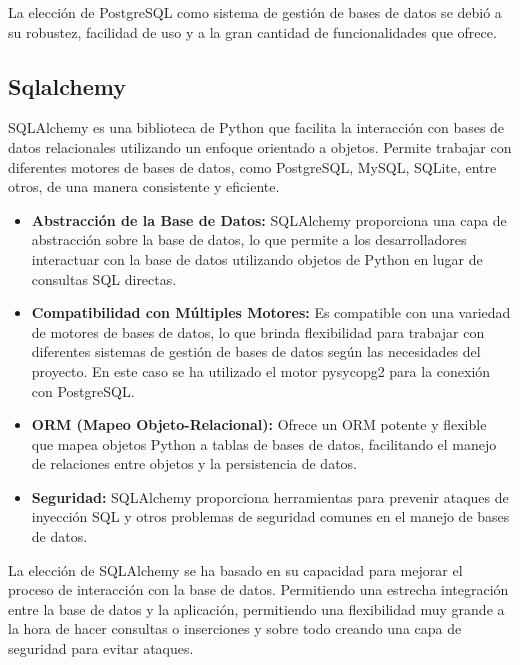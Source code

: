 La elección de PostgreSQL como sistema de gestión de bases de datos se debió a su robustez, facilidad de uso y a la gran cantidad de funcionalidades que ofrece.

\subsection{Sqlalchemy}
SQLAlchemy es una biblioteca de Python que facilita la interacción con bases de datos relacionales utilizando un enfoque orientado a objetos. Permite trabajar con diferentes motores de bases de datos, como PostgreSQL, MySQL, SQLite, entre otros, de una manera consistente y eficiente.

\begin{itemize}
	\item \textbf{Abstracción de la Base de Datos:} SQLAlchemy proporciona una capa de abstracción sobre la base de datos, lo que permite a los desarrolladores interactuar con la base de datos utilizando objetos de Python en lugar de consultas SQL directas.
	\item \textbf{Compatibilidad con Múltiples Motores:} Es compatible con una variedad de motores de bases de datos, lo que brinda flexibilidad para trabajar con diferentes sistemas de gestión de bases de datos según las necesidades del proyecto. En este caso se ha utilizado el motor pysycopg2 para la conexión con PostgreSQL.
	\item \textbf{ORM (Mapeo Objeto-Relacional):} Ofrece un ORM potente y flexible que mapea objetos Python a tablas de bases de datos, facilitando el manejo de relaciones entre objetos y la persistencia de datos.
	\item \textbf{Seguridad:} SQLAlchemy proporciona herramientas para prevenir ataques de inyección SQL y otros problemas de seguridad comunes en el manejo de bases de datos.
\end{itemize}

La elección de SQLAlchemy se ha basado en su capacidad para mejorar el proceso de interacción con la base de datos. Permitiendo una estrecha integración entre la base de datos y la aplicación, permitiendo una flexibilidad muy grande a la hora de hacer consultas o inserciones y sobre todo creando una capa de seguridad para evitar ataques.
